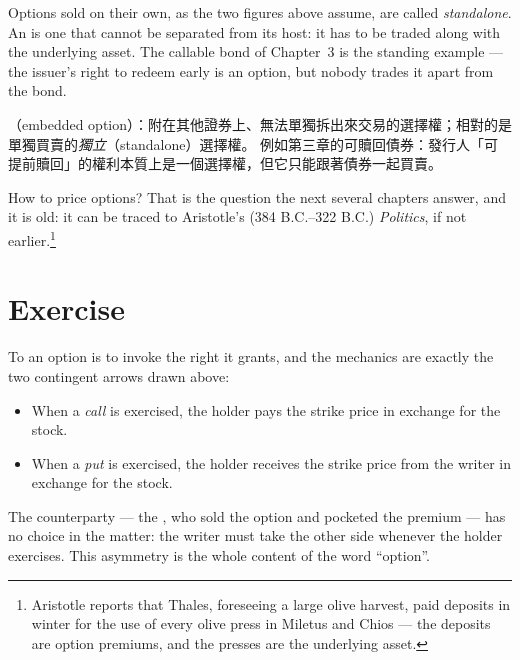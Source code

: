 \begin{notation}
	Options sold on their own, as the two figures above assume, are called \emph{standalone}.
	An  is one that cannot be separated from its host: it has to be traded along with the underlying asset.
\suppstart
	The callable bond of Chapter~3 is the standing example --- the issuer's right to redeem early is an option, but nobody trades it apart from the bond.
\suppend
\end{notation}

\suppstart
\begin{remark}
	（embedded option）：附在其他證券上、無法單獨拆出來交易的選擇權；相對的是單獨買賣的\emph{獨立}（standalone）選擇權。
	例如第三章的可贖回債券：發行人「可提前贖回」的權利本質上是一個選擇權，但它只能跟著債券一起買賣。
\end{remark}
\suppend

\begin{remark}
	How to price options?
	That is the question the next several chapters answer, and it is old: it can be traced to Aristotle's (384 B.C.--322 B.C.) \emph{Politics}, if not earlier.\footnote{Aristotle reports that Thales, foreseeing a large olive harvest, paid deposits in winter for the use of every olive press in Miletus and Chios --- the deposits are option premiums, and the presses are the underlying asset.}
\end{remark}

\section{Exercise}


To  an option is to invoke the right it grants, and the mechanics are exactly the two contingent arrows drawn above:

\begin{itemize}[itemsep=0.3em]
	\item When a \emph{call} is exercised, the holder pays the strike price in exchange for the stock.
	\item When a \emph{put} is exercised, the holder receives the strike price from the writer in exchange for the stock.
\end{itemize}

\suppstart
\noindent The counterparty --- the , who sold the option and pocketed the premium --- has no choice in the matter: the writer must take the other side whenever the holder exercises.
This asymmetry is the whole content of the word ``option''.

